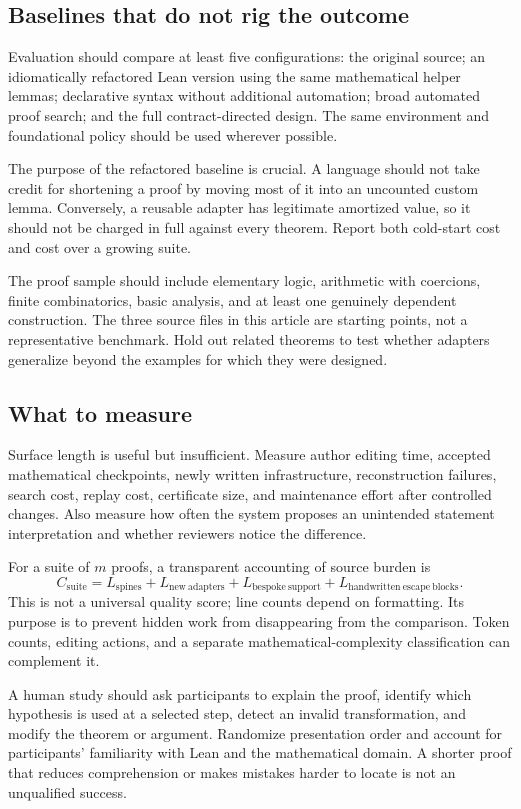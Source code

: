 \documentclass[11pt,a4paper]{article}
\theoremstyle{definition}
\theoremstyle{remark}
\begin{document}
\subsection{Baselines that do not rig the outcome}
Evaluation should compare at least five configurations: the original source; an idiomatically refactored Lean version using the same mathematical helper lemmas; declarative syntax without additional automation; broad automated proof search; and the full contract-directed design. The same environment and foundational policy should be used wherever possible.

The purpose of the refactored baseline is crucial. A language should not take credit for shortening a proof by moving most of it into an uncounted custom lemma. Conversely, a reusable adapter has legitimate amortized value, so it should not be charged in full against every theorem. Report both cold-start cost and cost over a growing suite.

The proof sample should include elementary logic, arithmetic with coercions, finite combinatorics, basic analysis, and at least one genuinely dependent construction. The three source files in this article are starting points, not a representative benchmark. Hold out related theorems to test whether adapters generalize beyond the examples for which they were designed.

\subsection{What to measure}
Surface length is useful but insufficient. Measure author editing time, accepted mathematical checkpoints, newly written infrastructure, reconstruction failures, search cost, replay cost, certificate size, and maintenance effort after controlled changes. Also measure how often the system proposes an unintended statement interpretation and whether reviewers notice the difference.

For a suite of $m$ proofs, a transparent accounting of source burden is
\[
 C_{\mathrm{suite}}=L_{\mathrm{spines}}+
 L_{\mathrm{new\ adapters}}+L_{\mathrm{bespoke\ support}}+
 L_{\mathrm{handwritten\ escape\ blocks}}.
\]
This is not a universal quality score; line counts depend on formatting. Its purpose is to prevent hidden work from disappearing from the comparison. Token counts, editing actions, and a separate mathematical-complexity classification can complement it.

A human study should ask participants to explain the proof, identify which hypothesis is used at a selected step, detect an invalid transformation, and modify the theorem or argument. Randomize presentation order and account for participants' familiarity with Lean and the mathematical domain. A shorter proof that reduces comprehension or makes mistakes harder to locate is not an unqualified success.
\end{document}
